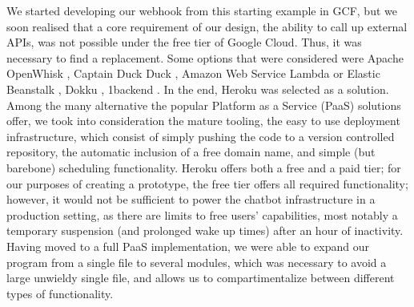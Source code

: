We started developing our webhook from this starting example in GCF, but we soon realised that a core requirement of our design, the ability to call up external APIs, was not possible under the free tier of Google Cloud. Thus, it was necessary to find a replacement. Some options that were considered were Apache OpenWhisk \cite{apacheopenwhisk}, Captain Duck Duck \cite{captainduckduck}, Amazon Web Service Lambda or Elastic Beanstalk \cite{awsproductwebsite}, Dokku \cite{dokku}, 1backend \cite{1backend}. In the end, Heroku was selected as a solution. Among the many alternative the popular Platform as a Service (PaaS) solutions offer, we took into consideration the mature tooling, the easy to use deployment infrastructure, which consist of simply pushing the code to a version controlled repository, the automatic inclusion of a free domain name, and simple (but barebone) scheduling functionality. Heroku offers both a free and a paid tier; for our purposes of creating a prototype, the free tier offers all required functionality; however, it would not be sufficient to power the chatbot infrastructure in a production setting, as there are limits to free users' capabilities, most notably a temporary suspension (and prolonged wake up times) after an hour of inactivity.
Having moved to a full PaaS implementation, we were able to expand our program from a single file to several modules, which was necessary to avoid a large unwieldy single file, and allows us to compartimentalize between different types of functionality.
